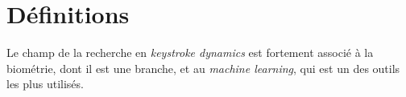 \section{Définitions}

Le champ de la recherche en \textit{keystroke dynamics} est fortement associé à la biométrie, dont il est une branche, et au \textit{machine learning}, qui est un des outils les plus utilisés. \\



